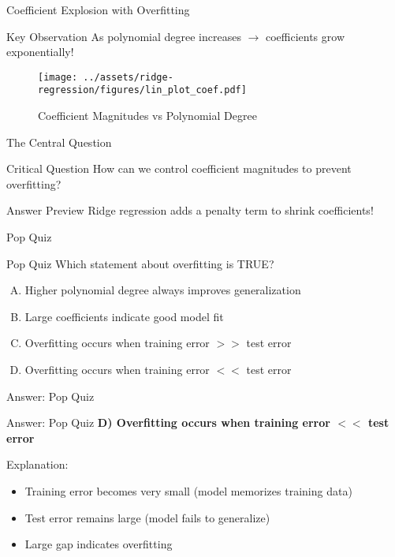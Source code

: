 \documentclass{beamer}
\begin{document}
\begin{frame}{Coefficient Explosion with Overfitting}
\vspace{0.1cm}
\begin{keypointsbox}{Key Observation}
As polynomial degree increases $\rightarrow$ coefficients grow exponentially!
\end{keypointsbox}
\vspace{0.1cm}
\begin{figure}\texttt{[image: ../assets/ridge-regression/figures/lin\_plot\_coef.pdf]}\caption{{\small Coefficient Magnitudes vs Polynomial Degree}}\end{figure}
\end{frame}

\begin{frame}{The Central Question}
\begin{alertbox}{Critical Question}
How can we control coefficient magnitudes to prevent overfitting?
\end{alertbox}
\pause

\begin{keypointsbox}{Answer Preview}
Ridge regression adds a penalty term to shrink coefficients!
\end{keypointsbox}
\end{frame}

\begin{frame}{Pop Quiz \thepopquiz}
\begin{popquizbox}{Pop Quiz \thepopquiz}
Which statement about overfitting is TRUE?
\begin{enumerate}[A)]
\item Higher polynomial degree always improves generalization
\item Large coefficients indicate good model fit
\item Overfitting occurs when training error $>>$ test error
\item Overfitting occurs when training error $<<$ test error
\end{enumerate}
\end{popquizbox}
\end{frame}

\begin{frame}{Answer: Pop Quiz \thepopquiz}
\begin{popquizbox}{Answer: Pop Quiz \thepopquiz}
\textbf{D) Overfitting occurs when training error $<<$ test error}

\vspace{0.3cm}
Explanation:
\begin{itemize}
\item Training error becomes very small (model memorizes training data)
\item Test error remains large (model fails to generalize)  
\item Large gap indicates overfitting
\end{itemize}
\end{popquizbox}
\end{frame}
\end{document}
